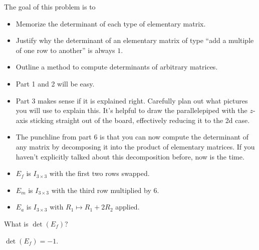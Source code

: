 \documentclass{workbook}
\newcommand{\bookonlynewpage}{\begin{bookonly}\newpage\end{bookonly}}
\begin{document}
\begin{slide}
	\bookonlynewpage
	\question
	\begin{annotation}
		\begin{goals}

			The goal of this problem is to
			\begin{itemize}
				\item Memorize the determinant of each type of elementary matrix.
				\item Justify why the determinant of an elementary matrix of type ``add a
					multiple of one row to another'' is always $1$.
				\item Outline a method to compute determinants of arbitrary matrices.
			\end{itemize}
		\end{goals}

		\begin{notes}
			\begin{itemize}
				\item Part 1 and 2 will be easy.
				\item Part 3 makes sense if it is explained right. Carefully
					plan out what pictures you will use to explain this.
					It's helpful to draw the parallelepiped with the $z$-axis sticking
					straight out of the board, effectively reducing it to the 2d case.
				\item The punchline from part 6 is that you can now compute the determinant
					of any matrix by decomposing it into the product of elementary matrices.
					If you haven't explicitly talked about this decomposition before, now is
					the time.
			\end{itemize}
		\end{notes}
	\end{annotation}
	\begin{itemize}
		\item $E_f$ is $I_{3\times 3}$ with the first two rows swapped.
		\item $E_m$ is $I_{3\times 3}$ with the third row multiplied by 6.
		\item $E_a$ is $I_{3\times 3}$ with $R_1\mapsto R_1+2R_2$ applied.
	\end{itemize}

	\begin{parts}
		\item What is $\det(E_f)$?
			\begin{solution}
				$\det(E_f)=-1$.


\end{solution}
\end{parts}
\end{slide}
\end{document}
